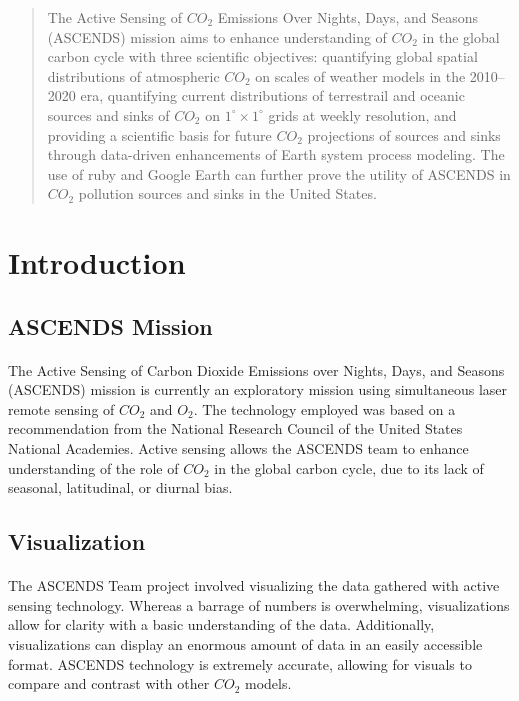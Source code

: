\documentclass[12pt,letterpaper]{report}
\begin{document}
 

 \begin{abstract}
 The Active Sensing of $CO_2$ Emissions Over Nights, Days, and Seasons (ASCENDS) mission aims to enhance understanding of $CO_2$ in the global carbon cycle with three scientific objectives: quantifying global spatial distributions of atmospheric $CO_2$ on scales of weather models in the 2010--2020 era, quantifying current distributions of terrestrail and oceanic sources and sinks of $CO_2$ on $1^\circ\times1^\circ$ grids at weekly resolution, and providing a scientific basis for future $CO_2$ projections of sources and sinks through data-driven enhancements of Earth system process modeling.  The use of ruby and Google Earth can further prove the utility of ASCENDS in $CO_2$ pollution sources and sinks in the United States.
 \end{abstract}

 \section*{Introduction}
  \subsection*{ASCENDS Mission}
   \paragraph{}
    The Active Sensing of Carbon Dioxide Emissions over Nights, Days, and Seasons (ASCENDS) mission is currently an exploratory mission using simultaneous laser remote sensing of $CO_2$ and $O_2$. The technology employed was based on a recommendation from the National Research Council of the United States National Academies. Active sensing allows the ASCENDS team to enhance understanding of the role of $CO_2$ in the global carbon cycle, due to its lack of seasonal, latitudinal, or diurnal bias.
  \subsection*{Visualization}
   \paragraph{}
    The ASCENDS Team project involved visualizing the data gathered with active sensing technology. Whereas a barrage of numbers is overwhelming, visualizations allow for clarity with a basic understanding of the data. Additionally, visualizations can display an enormous amount of data in an easily accessible format. ASCENDS technology is extremely accurate, allowing for visuals to compare and contrast with other $CO_2$ models.
\end{document}
